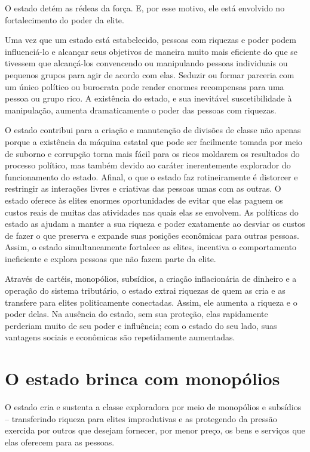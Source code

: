 O estado detém as rédeas da força. E, por esse motivo, ele está envolvido no fortalecimento do poder da elite. 

Uma vez que um estado está estabelecido, pessoas com riquezas e poder podem influenciá-lo e alcançar seus objetivos de maneira muito mais eficiente do que se tivessem que alcançá-los convencendo ou manipulando pessoas individuais ou pequenos grupos para agir de acordo com elas. Seduzir ou formar parceria com um único político ou burocrata pode render enormes recompensas para uma pessoa ou grupo rico. A existência do estado, e sua inevitável suscetibilidade à manipulação, aumenta dramaticamente o poder das pessoas com riquezas.

O estado contribui para a criação e manutenção de divisões de classe não apenas porque a existência da máquina estatal que pode ser facilmente tomada por meio de suborno e corrupção torna mais fácil para os ricos moldarem os resultados do processo político, mas também devido ao caráter inerentemente explorador do funcionamento do estado. Afinal, o que o estado faz rotineiramente é distorcer e restringir as interações livres e criativas das pessoas umas com as outras. O estado oferece às elites enormes oportunidades de evitar que elas paguem os custos reais de muitas das atividades nas quais elas se envolvem. As políticas do estado as ajudam a manter a sua riqueza e poder exatamente ao desviar os custos de fazer o que preserva e expande suas posições econômicas para outras pessoas. Assim, o estado simultaneamente fortalece as elites, incentiva o comportamento ineficiente e explora pessoas que não fazem parte da elite.

Através de cartéis, monopólios, subsídios, a criação inflacionária de dinheiro e a operação do sistema tributário, o estado extrai riquezas de quem as cria e as transfere para elites politicamente conectadas. Assim, ele aumenta a riqueza e o poder delas. Na ausência do estado, sem sua proteção, elas rapidamente perderiam muito de seu poder e influência; com o estado do seu lado, suas vantagens sociais e econômicas são repetidamente aumentadas.

\section{O estado brinca com monopólios}

O estado cria e sustenta a classe exploradora por meio de monopólios e subsídios -- transferindo riqueza para elites improdutivas e as protegendo da pressão exercida por outros que desejam fornecer, por menor preço, os bens e serviços que elas oferecem para as pessoas.

